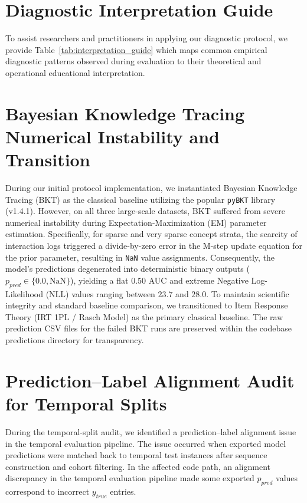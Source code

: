 

\clearpage

\section{Diagnostic Interpretation Guide}
\label{app:interpretation}
To assist researchers and practitioners in applying our diagnostic protocol, we provide Table~\ref{tab:interpretation_guide} which maps common empirical diagnostic patterns observed during evaluation to their theoretical and operational educational interpretation.



\section[Bayesian Knowledge Tracing Numerical Instability and Transition]{Bayesian Knowledge Tracing Numerical Instability and Transition}
\label{app:bkt_instability}
During our initial protocol implementation, we instantiated Bayesian Knowledge Tracing (BKT) as the classical baseline utilizing the popular \texttt{pyBKT} library (v1.4.1). However, on all three large-scale datasets, BKT suffered from severe numerical instability during Expectation-Maximization (EM) parameter estimation. Specifically, for sparse and very sparse concept strata, the scarcity of interaction logs triggered a divide-by-zero error in the M-step update equation for the prior parameter, resulting in \texttt{NaN} value assignments. Consequently, the model's predictions degenerated into deterministic binary outputs ($p_{pred} \in \{0.0, \text{NaN}\}$), yielding a flat $0.50$ AUC and extreme Negative Log-Likelihood (NLL) values ranging between $23.7$ and $28.0$. To maintain scientific integrity and standard baseline comparison, we transitioned to Item Response Theory (IRT 1PL / Rasch Model) as the primary classical baseline. The raw prediction CSV files for the failed BKT runs are preserved within the codebase predictions directory for transparency.

\section{Prediction--Label Alignment Audit for Temporal Splits}
\label{app:alignment}
During the temporal-split audit, we identified a prediction--label alignment issue in the temporal evaluation pipeline. The issue occurred when exported model predictions were matched back to temporal test instances after sequence construction and cohort filtering. In the affected code path, an alignment discrepancy in the temporal evaluation pipeline made some exported $p_{pred}$ values correspond to incorrect $y_{true}$ entries.

